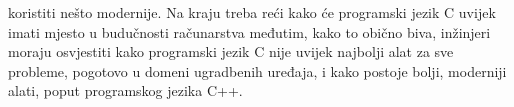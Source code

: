koristiti nešto modernije. Na kraju treba reći kako će programski jezik C uvijek imati mjesto u budučnosti računarstva međutim, kako to obično biva, inžinjeri moraju osvjestiti kako programski jezik C nije uvijek najbolji alat za sve probleme, pogotovo u domeni ugradbenih uređaja, i kako postoje bolji, moderniji alati, poput programskog jezika C++. 